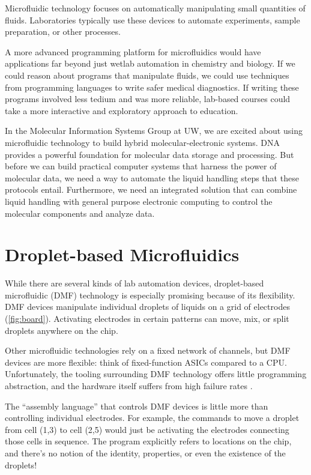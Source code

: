 \documentclass[
  10pt,
  a4paper,
  twocolumn,
]{article}
\begin{document}
Microfluidic technology focuses on automatically manipulating small quantities of fluids.
Laboratories typically use these devices to automate experiments, sample preparation, or other processes.

A more advanced programming platform for microfluidics would have applications far beyond just wetlab automation in chemistry and biology.
If we could reason about programs that manipulate fluids, we could use techniques from programming languages to write safer medical diagnostics.
If writing these programs involved less tedium and was more reliable, lab-based courses could take a more interactive and exploratory approach to education.

In the Molecular Information Systems Group at UW, we are excited about using microfluidic technology to build hybrid molecular-electronic systems.
DNA provides a powerful foundation for molecular data storage \cite{bornholt2016} and processing.
But before we can build practical computer systems that harness the power of molecular data, we need a way to automate the liquid handling steps that these protocols entail.
Furthermore, we need an integrated solution that can combine liquid handling with general purpose electronic computing to control the molecular components and analyze data.

\section*{Droplet-based Microfluidics}

While there are several kinds of lab automation devices,
droplet-based microfluidic (DMF) technology is especially promising because of its flexibility.
DMF devices manipulate individual droplets of liquids on a grid of electrodes (\autoref{fig:board}).
Activating electrodes in certain patterns can move, mix, or split droplets anywhere on the chip.

Other microfluidic technologies rely on a fixed network of channels, but DMF
devices are more flexible: think of fixed-function ASICs compared to a CPU.
Unfortunately, the tooling surrounding DMF technology offers little programming abstraction,
and the hardware itself suffers from high failure rates \cite{dmf-review}.

The ``assembly language'' that controls DMF devices is little more than controlling individual electrodes.
For example, the commands to move a droplet from cell (1,3) to cell (2,5) would just be activating the electrodes connecting those cells in sequence.
The program explicitly refers to locations on the chip, and there's no notion of the identity, properties, or even the existence of the droplets!
\end{document}
